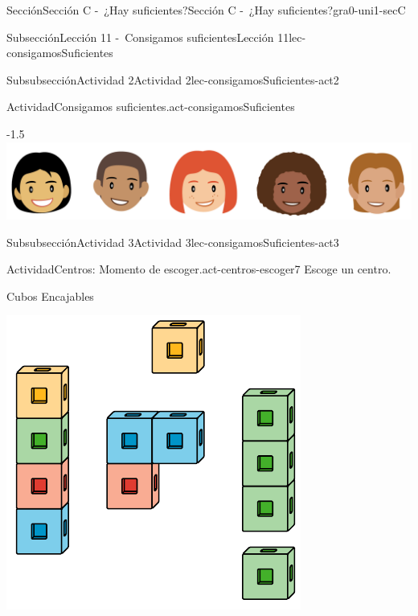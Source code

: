 \documentclass[twoside,10pt,]{article}
\begin{document}
\begin{sectionptx}{Sección}{Sección C -~¿Hay suficientes?}{}{Sección C -~¿Hay suficientes?}{}{}{gra0-uni1-secC}
\begin{subsectionptx}{Subsección}{Lección 11 -~Consigamos suficientes}{}{Lección 11}{}{}{lec-consigamosSuficientes}
\begin{subsubsectionptx}{Subsubsección}{Actividad 2}{}{Actividad 2}{}{}{lec-consigamosSuficientes-act2}
\begin{activity}{Actividad}{Consigamos suficientes.}{act-consigamosSuficientes}
\begin{image}{0.125}{0.75}{0.125}{-1.5\baselineskip}%
\includegraphics[width=\linewidth]{external/png-source/K.1 Revisions.StudentFacesInARow.png}
\end{image}%
\end{activity}%
\end{subsubsectionptx}
%
%
\typeout{************************************************}
\typeout{************************************************}
%
\begin{subsubsectionptx}{Subsubsección}{Actividad 3}{}{Actividad 3}{}{}{lec-consigamosSuficientes-act3}
\begin{activity}{Actividad}{Centros: Momento de escoger.}{act-centros-escoger7}%
Escoge un centro.%
\begin{sidebyside}{2}{0.025}{0.025}{0.05}%
\begin{sbspanel}{0.45}%
Cubos Encajables%
\par
\includegraphics[width=\linewidth]{external/svg-source/tikz-file-128850.pdf}

\end{sbspanel}
\end{sidebyside}
\end{activity}
\end{subsubsectionptx}
\end{subsectionptx}
\end{sectionptx}
\end{document}
